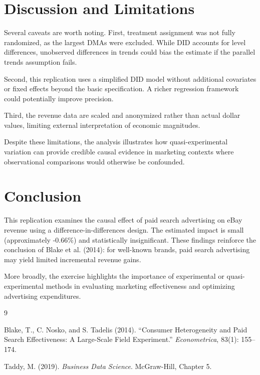 \documentclass[12pt]{article}
\begin{document}
	\section{Discussion and Limitations}
	
	Several caveats are worth noting. First, treatment assignment was not fully randomized, as the largest DMAs were excluded. While DID accounts for level differences, unobserved differences in trends could bias the estimate if the parallel trends assumption fails.
	
	Second, this replication uses a simplified DID model without additional covariates or fixed effects beyond the basic specification. A richer regression framework could potentially improve precision.
	
	Third, the revenue data are scaled and anonymized rather than actual dollar values, limiting external interpretation of economic magnitudes.
	
	Despite these limitations, the analysis illustrates how quasi-experimental variation can provide credible causal evidence in marketing contexts where observational comparisons would otherwise be confounded.
	
	\section{Conclusion}
	
	This replication examines the causal effect of paid search advertising on eBay revenue using a difference-in-differences design. The estimated impact is small (approximately -0.66\%) and statistically insignificant. These findings reinforce the conclusion of Blake et al. (2014): for well-known brands, paid search advertising may yield limited incremental revenue gains.
	
	More broadly, the exercise highlights the importance of experimental or quasi-experimental methods in evaluating marketing effectiveness and optimizing advertising expenditures.
	
	\begin{thebibliography}{9}
		
		Blake, T., C. Nosko, and S. Tadelis (2014).
		``Consumer Heterogeneity and Paid Search Effectiveness: A Large-Scale Field Experiment.''
		\textit{Econometrica}, 83(1): 155--174.
		
		Taddy, M. (2019).
		\textit{Business Data Science}. McGraw-Hill, Chapter 5.
		
	\end{thebibliography}
	
\end{document}
